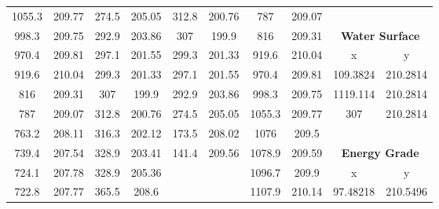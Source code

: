 \begin{center}
\begin{tabular}{|cccc||cccc||cc|}
    1055.3   & 209.77                   & 274.5 & 205.05                        & 312.8 & 200.76                              & 787    & 209.07                                &          &                                     \\
    998.3    & 209.75                   & 292.9 & 203.86                        & 307   & 199.9                               & 816    & 209.31                                & \multicolumn{2}{c|}{\textbf{Water Surface }}   \\ 
    \cline{9-10}
    970.4    & 209.81                   & 297.1 & 201.55                        & 299.3 & 201.33                              & 919.6  & 210.04                                & x        & y                                   \\
    919.6    & 210.04                   & 299.3 & 201.33                        & 297.1 & 201.55                              & 970.4  & 209.81                                & 109.3824 & 210.2814                            \\
    816      & 209.31                   & 307   & 199.9                         & 292.9 & 203.86                              & 998.3  & 209.75                                & 1119.114 & 210.2814                            \\
    787      & 209.07                   & 312.8 & 200.76                        & 274.5 & 205.05                              & 1055.3 & 209.77                                & 307      & 210.2814                            \\
    763.2    & 208.11                   & 316.3 & 202.12                        & 173.5 & 208.02                              & 1076   & 209.5                                 &          &                                     \\
    739.4    & 207.54                   & 328.9 & 203.41                        & 141.4 & 209.56                              & 1078.9 & 209.59                                & \multicolumn{2}{c|}{\textbf{Energy Grade }}    \\ 
    \cline{9-10}
    724.1    & 207.78                   & 328.9 & 205.36                        &       &                                     & 1096.7 & 209.9                                 & x        & y                                   \\
    722.8    & 207.77                   & 365.5 & 208.6                         &       &                                     & 1107.9 & 210.14                                & 97.48218 & 210.5496                            \\

\end{tabular}
\end{center}
